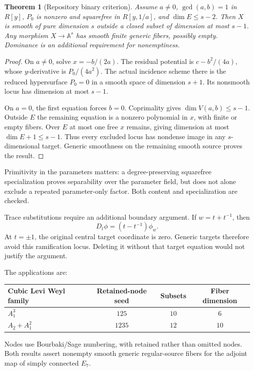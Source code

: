 \documentclass[11pt]{article}
\newtheorem{theorem}{Theorem}[section]
\begin{document}
\begin{theorem}[Repository binary criterion]\label{thm:binary}
Assume $a\ne0$, $\gcd(a,b)=1$ in $R[y]$, $P_0$ is nonzero and squarefree in $R[y,1/a]$, and $\dim E\le s-2$. Then $X$ is smooth of pure dimension $s$ outside a closed subset of dimension at most $s-1$. Any morphism $X\to\mathbb A^s$ has smooth finite generic fibers, possibly empty. Dominance is an additional requirement for nonemptiness.
\end{theorem}

\begin{proof}
On $a\ne0$, solve $x=-b/(2a)$. The residual potential is $c-b^2/(4a)$, whose $y$-derivative is $P_0/(4a^2)$. The actual incidence scheme there is the reduced hypersurface $P_0=0$ in a smooth space of dimension $s+1$. Its nonsmooth locus has dimension at most $s-1$.

On $a=0$, the first equation forces $b=0$. Coprimality gives $\dim V(a,b)\le s-1$. Outside $E$ the remaining equation is a nonzero polynomial in $x$, with finite or empty fibers. Over $E$ at most one free $x$ remains, giving dimension at most $\dim E+1\le s-1$. Thus every excluded locus has nondense image in any $s$-dimensional target. Generic smoothness on the remaining smooth source proves the result.
\end{proof}

Primitivity in the parameters matters: a degree-preserving squarefree specialization proves separability over the parameter field, but does not alone exclude a repeated parameter-only factor. Both content and specialization are checked.

Trace substitutions require an additional boundary argument. If $w=t+t^{-1}$, then
\[
 D_t\phi=(t-t^{-1})\phi_w.
\]
At $t=\pm1$, the original central target coordinate is zero. Generic targets therefore avoid this ramification locus. Deleting it without that target equation would not justify the argument.

The applications are:
\begin{center}
\begin{tabular}{lccc}
\toprule
Cubic Levi Weyl family & Retained-node seed & Subsets & Fiber dimension\\
\midrule
$A_1^3$ & $125$ & $10$ & $6$\\
$A_2+A_1^2$ & $1235$ & $12$ & $10$\\
\bottomrule
\end{tabular}
\end{center}
Nodes use Bourbaki/Sage numbering, with retained rather than omitted nodes. Both results assert nonempty smooth generic regular-source fibers for the adjoint map of simply connected $E_7$.
\end{document}
